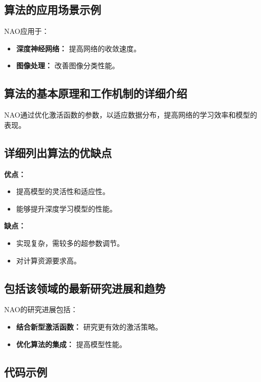 \subsection*{算法的应用场景示例}
NAO应用于：
\begin{itemize}
    \item \textbf{深度神经网络：} 提高网络的收敛速度。
    \item \textbf{图像处理：} 改善图像分类性能。
\end{itemize}

\subsection*{算法的基本原理和工作机制的详细介绍}
NAO通过优化激活函数的参数，以适应数据分布，提高网络的学习效率和模型的表现。

\subsection*{详细列出算法的优缺点}
\textbf{优点：}
\begin{itemize}
    \item 提高模型的灵活性和适应性。
    \item 能够提升深度学习模型的性能。
\end{itemize}

\textbf{缺点：}
\begin{itemize}
    \item 实现复杂，需较多的超参数调节。
    \item 对计算资源要求高。
\end{itemize}

\subsection*{包括该领域的最新研究进展和趋势}
NAO的研究进展包括：
\begin{itemize}
    \item \textbf{结合新型激活函数：} 研究更有效的激活策略。
    \item \textbf{优化算法的集成：} 提高模型性能。
\end{itemize}
\subsection*{代码示例}
\begin{lstlisting}

\end{lstlisting}


